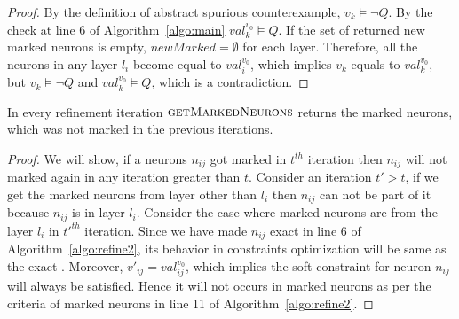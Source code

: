 \begin{proof}
By the definition of abstract spurious counterexample, ${v_k} \models \lnot Q$. 
By the check at line 6 of Algorithm~\ref{algo:main} ${val_k^{{v_0}}} \models Q$. 
If the set of returned new marked neurons is empty, $newMarked = \emptyset$ for each layer. 
Therefore, all the neurons in any layer $l_i$ become equal to ${val_i^{{v_0}}}$,  
which implies ${v_k}$ equals to ${val_k^{{v_0}}}$, but ${v_k} \models \lnot Q$ and 
${val_k^{{v_0}}} \models Q$, which is a contradiction.   
\end{proof}


\begin{theorem}
  \label{th:progress2}
  In every refinement iteration $\textsc{getMarkedNeurons}$
  returns the marked neurons, which was not marked in the previous iterations. 
\end{theorem}

\begin{proof}
We will show, if a neurons $n_{ij}$ got marked in $t^{th}$ iteration then $n_{ij}$ will not marked again 
in any iteration greater than $t$.
Consider an iteration $t' > t$, if we get the marked neurons from layer other
than $l_i$ then $n_{ij}$ can not be part of it because $n_{ij}$ is in layer $l_i$. 
Consider the case where marked neurons are from the layer $l_i$ in $t'^{th}$ iteration. 
Since we have made $n_{ij}$ exact in line 6 of Algorithm~\ref{algo:refine2},
its behavior in constraints optimization will be same as the exact \relu{}. 
Moreover, $v'_{ij} = val_{ij}^{v_0}$, 
which implies the soft constraint for neuron $n_{ij}$ will always be satisfied. Hence it will not occurs in 
marked neurons as per the criteria of marked neurons in line 11 of Algorithm~\ref{algo:refine2}.   
\end{proof}


